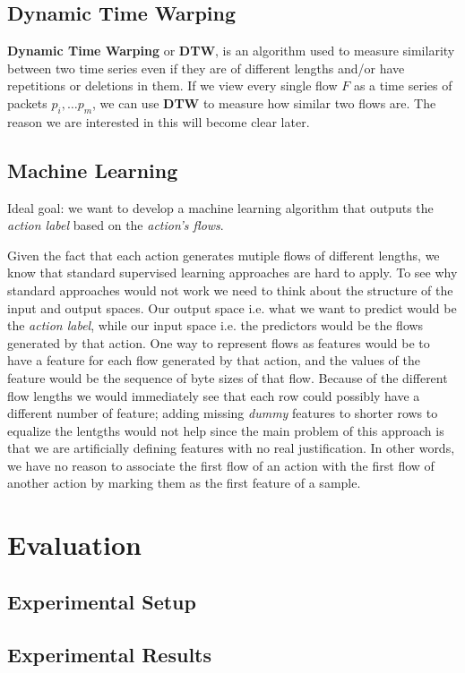 \documentclass[a4paper,10pt]{scrartcl}
\begin{document}
\subsection{Dynamic Time Warping}
\textbf{Dynamic Time Warping} or \textbf{DTW}, is an algorithm used to measure similarity between two time series even if they are of different lengths and/or have repetitions or deletions in them. If we view every single flow $F$ as a time series of packets $p_i,\dots p_m$, we can use \textbf{DTW} to measure how similar two flows are. The reason we are interested in this will become clear later.

\subsection{Machine Learning}
\label{subsec:ml}
Ideal goal: we want to develop a machine learning algorithm that outputs the \textit{action label} based on the \textit{action's flows}.

Given the fact that each action generates mutiple flows of different lengths, we know that standard supervised learning approaches are hard to apply. To see why standard approaches would not work we need to think about the structure of the input and output spaces. Our output space i.e. what we want to predict would be the \textit{action label}, while our input space i.e. the predictors would be the flows generated by that action. One way to represent flows as features would be to have a feature for each flow generated by that action, and the values of the feature would be the sequence of byte sizes of that flow. Because of the different flow lengths we would immediately see that each row could possibly have a different number of feature; adding missing \textit{dummy} features to shorter rows to equalize the lentgths would not help since the main problem of this approach is that we are artificially defining features with no real justification. In other words, we have no reason to associate the first flow of an action with the first flow of another action by marking them as the first feature of a sample.


\section{Evaluation}
\subsection{Experimental Setup}
\subsection{Experimental Results}
\end{document}
